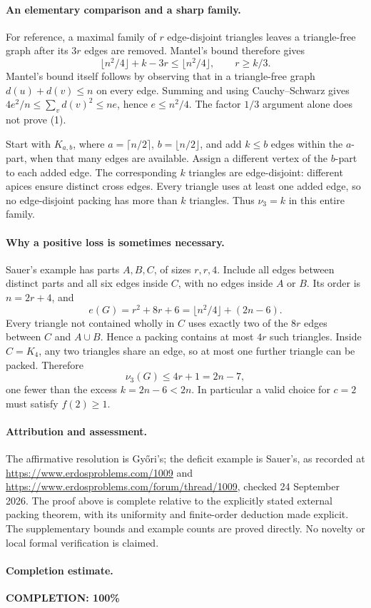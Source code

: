 \paragraph{An elementary comparison and a sharp family.}
For reference, a maximal family of \(r\) edge-disjoint triangles leaves a triangle-free graph after its \(3r\) edges are removed. Mantel's bound therefore gives
\[
 \lfloor n^2/4\rfloor+k-3r\leq\lfloor n^2/4\rfloor,
 \qquad r\geq k/3.
\]
Mantel's bound itself follows by observing that in a triangle-free graph \(d(u)+d(v)\leq n\) on every edge. Summing and using Cauchy--Schwarz gives
\(4e^2/n\leq\sum_vd(v)^2\leq ne\), hence \(e\leq n^2/4\). The factor \(1/3\) argument alone does not prove (1).

Start with \(K_{a,b}\), where \(a=\lceil n/2\rceil\), \(b=\lfloor n/2\rfloor\), and add \(k\leq b\) edges within the \(a\)-part, when that many edges are available. Assign a different vertex of the \(b\)-part to each added edge. The corresponding \(k\) triangles are edge-disjoint: different apices ensure distinct cross edges. Every triangle uses at least one added edge, so no edge-disjoint packing has more than \(k\) triangles. Thus \(\nu_3=k\) in this entire family.

\paragraph{Why a positive loss is sometimes necessary.}
Sauer's example has parts \(A,B,C\), of sizes \(r,r,4\). Include all edges between distinct parts and all six edges inside \(C\), with no edges inside \(A\) or \(B\). Its order is \(n=2r+4\), and
\[
 e(G)=r^2+8r+6
      =\lfloor n^2/4\rfloor+(2n-6).
\]
Every triangle not contained wholly in \(C\) uses exactly two of the \(8r\) edges between \(C\) and \(A\cup B\). Hence a packing contains at most \(4r\) such triangles. Inside \(C=K_4\), any two triangles share an edge, so at most one further triangle can be packed. Therefore
\[
 \nu_3(G)\leq4r+1=2n-7,
\]
one fewer than the excess \(k=2n-6<2n\). In particular a valid choice for \(c=2\) must satisfy \(f(2)\geq1\).

\paragraph{Attribution and assessment.}
The affirmative resolution is Gy\H{o}ri's; the deficit example is Sauer's, as recorded at \url{https://www.erdosproblems.com/1009} and \url{https://www.erdosproblems.com/forum/thread/1009}, checked 24 September 2026. The proof above is complete relative to the explicitly stated external packing theorem, with its uniformity and finite-order deduction made explicit. The supplementary bounds and example counts are proved directly. No novelty or local formal verification is claimed.

\paragraph{Completion estimate.}
\textbf{COMPLETION: 100\%}
